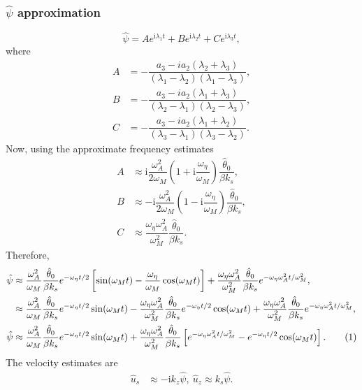 \documentclass[12pt,psfig]{article}
\newcommand\numberthis{\addtocounter{equation}{1}\tag{\theequation}}
\begin{document}
\subsubsection{$\hat{\psi}$ approximation}
$$\hat{\psi}=Ae^{\mathrm{i}\lambda_1 t}+Be^{\mathrm{i}\lambda_2 t}+Ce^{\mathrm{i}\lambda_3 t},$$ where
\begin{align*}
A&=-\dfrac{a_3-i a_2 (\lambda_2+ \lambda_3)}{(\lambda_1-\lambda_2) (\lambda_1-\lambda_3)},\\
B&=-\dfrac{a_3-i a_2 (\lambda_1+ \lambda_3)}{(\lambda_2-\lambda_1) (\lambda_2-\lambda_3)},\\
C&=-\dfrac{a_3-i a_2 (\lambda_1+ \lambda_2)}{(\lambda_3-\lambda_1) (\lambda_3-\lambda_2)}.
\end{align*}
Now, using the approximate frequency estimates
\begin{align*}
A&\approx \mathrm{i}\dfrac{\omega_A^2}{2\omega_M}\left(1+\mathrm{i} \dfrac{\omega_\eta }{\omega_M}\right)\dfrac{\hat{\theta}_0}{\beta k_s},\\
B&\approx -\mathrm{i}\dfrac{\omega_A^2}{2\omega_M}\left(1-\mathrm{i} \dfrac{\omega_\eta }{\omega_M}\right)\dfrac{\hat{\theta}_0}{\beta k_s},\\
C&\approx \dfrac{\omega_\eta\omega_A^2}{\omega_M^2}\dfrac{\hat{\theta}_0}{\beta k_s}.
\end{align*}
Therefore,
\begin{align*}
\hat{\psi}&\approx \dfrac{\omega_A^2}{\omega_M}\dfrac{\hat{\theta}_0}{\beta k_s}e^{-\omega_\eta t/2}\left[\sin(\omega_M t)-\dfrac{\omega_\eta}{\omega_M}\cos(\omega_M t)\right]+\dfrac{\omega_\eta\omega_A^2}{\omega_M^2}\dfrac{\hat{\theta}_0}{\beta k_s}e^{-\omega_\eta\omega_A^2t/\omega_M^2},\\
&\approx \dfrac{\omega_A^2}{\omega_M}\dfrac{\hat{\theta}_0}{\beta k_s}e^{-\omega_\eta t/2}\sin(\omega_M t)-\dfrac{\omega_\eta\omega_A^2}{\omega_M^2}\dfrac{\hat{\theta}_0}{\beta k_s}e^{-\omega_\eta t/2}\cos(\omega_M t)+\dfrac{\omega_\eta\omega_A^2}{\omega_M^2}\dfrac{\hat{\theta}_0}{\beta k_s}e^{-\omega_\eta\omega_A^2t/\omega_M^2},\\
\hat{\psi}&\approx \dfrac{\omega_A^2}{\omega_M}\dfrac{\hat{\theta}_0}{\beta k_s}e^{-\omega_\eta t/2}\sin(\omega_M t)+\dfrac{\omega_\eta\omega_A^2}{\omega_M^2}\dfrac{\hat{\theta}_0}{\beta k_s}\left[e^{-\omega_\eta\omega_A^2t/\omega_M^2}-e^{-\omega_\eta t/2}\cos(\omega_M t)\right].\numberthis \label{psib}
\end{align*}
The velocity estimates are
\begin{align*}
\hat{u}_s&\approx -\mathrm{i}k_z\hat{\psi}, \
\hat{u}_z\approx k_s \hat{\psi}.
\end{align*}
\end{document}
